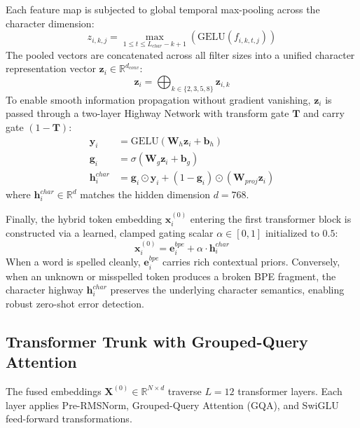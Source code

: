 \documentclass[10pt,journal,compsoc]{IEEEtran}
\begin{document}
Each feature map is subjected to global temporal max-pooling across the character dimension:
\begin{equation}
z_{i,k,j} = \max_{1 \le t \le L_{char} - k + 1} \left( \mathrm{GELU}(f_{i,k,t,j}) \right)
\end{equation}
The pooled vectors are concatenated across all filter sizes into a unified character representation vector $\mathbf{z}_i \in \mathbb{R}^{d_{conv}}$:
\begin{equation}
\mathbf{z}_i = \bigoplus_{k \in \{2, 3, 5, 8\}} \mathbf{z}_{i,k}
\end{equation}
To enable smooth information propagation without gradient vanishing, $\mathbf{z}_i$ is passed through a two-layer Highway Network with transform gate $\mathbf{T}$ and carry gate $(1 - \mathbf{T})$:
\begin{align}
\mathbf{y}_i &= \mathrm{GELU}(\mathbf{W}_h \mathbf{z}_i + \mathbf{b}_h) \\
\mathbf{g}_i &= \sigma(\mathbf{W}_g \mathbf{z}_i + \mathbf{b}_g) \\
\mathbf{h}_i^{char} &= \mathbf{g}_i \odot \mathbf{y}_i + (1 - \mathbf{g}_i) \odot (\mathbf{W}_{proj} \mathbf{z}_i)
\end{align}
where $\mathbf{h}_i^{char} \in \mathbb{R}^d$ matches the hidden dimension $d = 768$.

Finally, the hybrid token embedding $\mathbf{x}_i^{(0)}$ entering the first transformer block is constructed via a learned, clamped gating scalar $\alpha \in [0, 1]$ initialized to $0.5$:
\begin{equation}
\mathbf{x}_i^{(0)} = \mathbf{e}_i^{bpe} + \alpha \cdot \mathbf{h}_i^{char}
\label{eq:highway_fusion}
\end{equation}
When a word is spelled cleanly, $\mathbf{e}_i^{bpe}$ carries rich contextual priors. Conversely, when an unknown or misspelled token produces a broken BPE fragment, the character highway $\mathbf{h}_i^{char}$ preserves the underlying character semantics, enabling robust zero-shot error detection.

\subsection{Transformer Trunk with Grouped-Query Attention}
The fused embeddings $\mathbf{X}^{(0)} \in \mathbb{R}^{N \times d}$ traverse $L = 12$ transformer layers. Each layer applies Pre-RMSNorm, Grouped-Query Attention (GQA), and SwiGLU feed-forward transformations.
\end{document}
